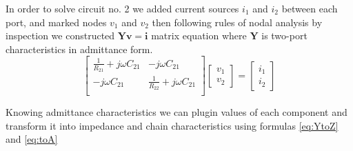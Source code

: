 \documentclass[notitlepage, a4paper, 11pt]{article}
\begin{document}
	In order to solve circuit no. 2 we added current sources $i_1$ and $i_2$ between each port, and marked nodes $v_1$ and $v_2$ then following rules of nodal analysis by inspection we constructed $\mathbf{Yv=i}$ matrix equation where $\mathbf{Y}$ is two-port characteristics in admittance form.
	\begin{equation}
		\begin{bmatrix}
			\frac{1}{R_{21}} + j\omega C_{21} & -j\omega C_{21} \\
			-j\omega C_{21} & \frac{1}{R_{22}} + j\omega C_{21} \\
		\end{bmatrix}
		\begin{bmatrix}
			v_1 \\
			v_2
		\end{bmatrix}
		=
		\begin{bmatrix}
			i_1 \\
			i_2
		\end{bmatrix}
	\end{equation}	
	
	Knowing admittance characteristics we can plugin values of each component and transform it into impedance and chain characteristics using formulas \eqref{eq:YtoZ} and \eqref{eq:toA}
	
\end{document}
